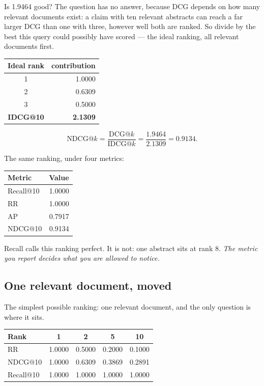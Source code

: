 \documentclass[11pt,a4paper]{article}
\begin{document}
Is 1.9464 good? The question has no answer, because DCG depends on how many
relevant documents exist: a claim with ten relevant abstracts can reach a far
larger DCG than one with three, however well both are ranked. So divide by the
best this query could possibly have scored --- the ideal ranking, all relevant
documents first.

\begin{center}
\small
\begin{tabular}{cr}
\toprule
\textbf{Ideal rank} & \textbf{contribution} \\
\midrule
1 & 1.0000 \\
2 & 0.6309 \\
3 & 0.5000 \\
\midrule
\textbf{IDCG@10} & \textbf{2.1309} \\
\bottomrule
\end{tabular}
\end{center}

\begin{derivbox}[title={NDCG}]
\[
  \text{NDCG}@k = \frac{\text{DCG}@k}{\text{IDCG}@k}
  = \frac{1.9464}{2.1309} = 0.9134 .
\]
\end{derivbox}

The same ranking, under four metrics:

\begin{center}
\small
\begin{tabular}{lr}
\toprule
\textbf{Metric} & \textbf{Value} \\
\midrule
Recall@10 & 1.0000 \\
RR        & 1.0000 \\
AP        & 0.7917 \\
NDCG@10   & 0.9134 \\
\bottomrule
\end{tabular}
\end{center}

Recall calls this ranking perfect. It is not: one abstract sits at rank 8.
\emph{The metric you report decides what you are allowed to notice.}

\subsection{One relevant document, moved}

The simplest possible ranking: one relevant document, and the only question is
where it sits.

\begin{center}
\small
\begin{tabular}{lcccc}
\toprule
\textbf{Rank} & 1 & 2 & 5 & 10 \\
\midrule
RR        & 1.0000 & 0.5000 & 0.2000 & 0.1000 \\
NDCG@10   & 1.0000 & 0.6309 & 0.3869 & 0.2891 \\
Recall@10 & 1.0000 & 1.0000 & 1.0000 & 1.0000 \\
\bottomrule
\end{tabular}
\end{center}
\end{document}
